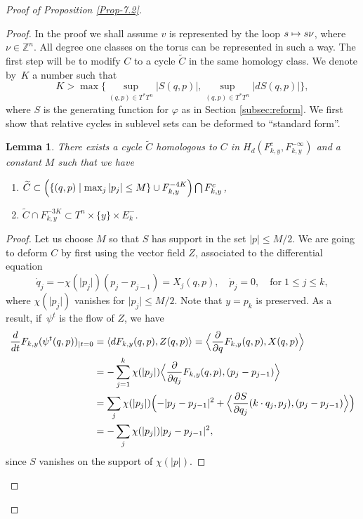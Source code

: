 \documentclass[JEP,XML,SOM,NoFloatCountersInSection,Unicode,published]{cedram}
\newenvironment{enumeratei}
{\bgroup\def\theenumi{\roman{enumi}}\def\theenumii{\arabic{enumii}}\begin{enumerate}}
{\end{enumerate}\egroup}
\newcommand\mto{\mathchoice{\longmapsto}{\mapsto}{\mapsto}{\mapsto}}
\numberwithin{equation}{section}
\theoremstyle{plain}
\newtheorem{lemma}[theorem]{Lemma}
\theoremstyle{definition}
\theoremstyle{remark}
\begin{document}
\begin{proof}[Proof of Proposition \ref{Prop-7.2}]
\begin{proof} In the proof we shall assume $v$ is represented by the loop $s \mto s\nu $, where $\nu \in {\mathbb Z}^n$. All degree one classes on the torus can be represented in such a way.
The first step will be to modify $C$ to a cycle $\widetilde C$ in the same homology class. We denote by~$K$ a number such that
\[
K> \max\biggl\{\sup_{(q,p)\in T^*T^n} \vert S(q,p) \vert, \sup_ {(q,p)\in T^*T^n}\vert dS(q,p) \vert \biggr\},
\]
where $S$ is the generating function for $\varphi$ as in Section \ref{subsec:reform}.
We first show that relative cycles in sublevel sets can be deformed to ``standard form''.
\begin{lemma} \label{Lem-7.5}
There exists a cycle $\widetilde C$ homologous to $C$ in $H_d(F_{k,y}^c, F_{k,y}^{-\infty})$ and a constant $M$ such that
we have
\begin{enumeratei}
\item \label{U} $\widetilde C \subset \Bigl (\left\{(q,p) \mid \max_j \vert p_j \vert \leq M \right\} \cup F_{k,y}^{-4K}\Bigr) \bigcap F_{k,y}^c$,
\item \label{V} $\widetilde C \cap F_{k,y}^{-3K} \subset T^n\times \{y\}\times E_k^-$.
\end{enumeratei}
\end{lemma}
\begin{proof}
Let us choose $M$ so that $S$ has support in the set $ \vert p \vert \leq M/2$. We are going to deform $C$ by first using the vector field $Z$, associated to the differential equation
\[
\dot q_j = -\chi(\vert p_j \vert) (p_j-p_{j-1})=X_j(q,p), \quad \dot p_j=0,\quad \text{for}\; 1\leq j \leq k,
\]
where $\chi (\vert p_j \vert)$ vanishes for $ \vert p_j \vert \leq M/2$. Note that $y=p_k$ is preserved. As a result, if~$\psi^t$ is the flow of $Z$, we have
\begin{align*}
\frac{d}{dt}F_{k,y}(\psi^t(q,p))_{\mid t=0}&= \langle dF_{k,y}(q,p), Z(q,p) \rangle =\Bigl\langle \frac{\partial}{\partial q}F_{k,y}(q,p), X(q,p)\Bigr\rangle\\
&= -\sum_{j=1}^{k} \chi(\vert p_j \vert) \Bigl\langle \frac{\partial}{\partial q_j}F_{k,y}(q,p), (p_j-p_{j-1}) \Bigr\rangle\\
&= \sum_j \chi(\vert p_j \vert) \Bigl (-\vert p_j-p_{j-1} \vert^2+ \Bigl\langle \frac{\partial S}{\partial q_j}(k\cdot q_j,p_j), (p_j-p_{j-1}) \Bigr\rangle \Bigr)\\
&= - \sum_j \chi(\vert p_j \vert) \vert p_j-p_{j-1} \vert^2,
\end{align*}
since $S$ vanishes on the support of $\chi (\vert p \vert)$.

\end{proof}
\end{proof}
\end{proof}
\end{document}

